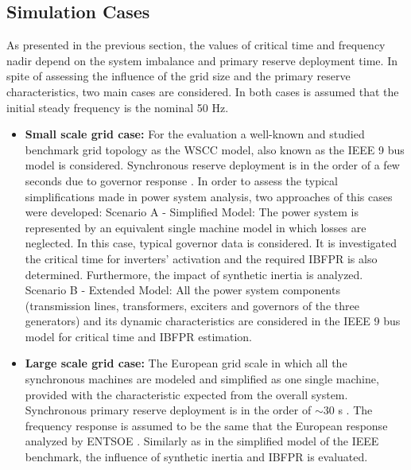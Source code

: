 \subsection{Simulation Cases}

As presented in the previous section, the values of critical time and frequency nadir depend on the system imbalance and primary reserve deployment time. In spite of assessing the influence of the grid size and the primary reserve characteristics, two main cases are considered. In both cases is assumed that the initial steady frequency is the nominal 50 Hz.


\begin{itemize}[leftmargin=*,labelsep=5.8mm]
	\item \textbf{Small scale grid case:} For the evaluation a well-known and studied benchmark grid topology as the WSCC model, also known as the IEEE 9 bus model is considered. Synchronous reserve deployment is in the order of a few seconds due to governor response \cite{kundur1994power, sundaram2008comparing}. In order to assess the typical simplifications made in power system analysis, two approaches of this cases were developed:
	\subitem Scenario A - Simplified Model: The power system is represented by an equivalent single machine model in which losses are neglected. In this case, typical governor data is considered. It is investigated the critical time for inverters' activation and the required IBFPR is  also determined. Furthermore, the impact of synthetic inertia is analyzed.
	\subitem Scenario B - Extended Model: All the power system components (transmission lines, transformers, exciters and governors of the three generators) and its dynamic characteristics are considered in the IEEE 9 bus model for critical time and IBFPR estimation.\\
	\item \textbf{Large scale grid case:} The European grid scale in which all the synchronous machines are modeled and simplified as one single machine, provided with the characteristic expected from the overall system. Synchronous primary reserve deployment is in the order of $ \sim30 $ s \cite{ENTSOE.2016, hultholm2015optimal}. The frequency response is assumed to be the same that the European response analyzed by ENTSOE \cite{ENTSOE.2016}. Similarly as in the simplified model of the IEEE benchmark, the influence of synthetic inertia and IBFPR is evaluated.
\end{itemize}

